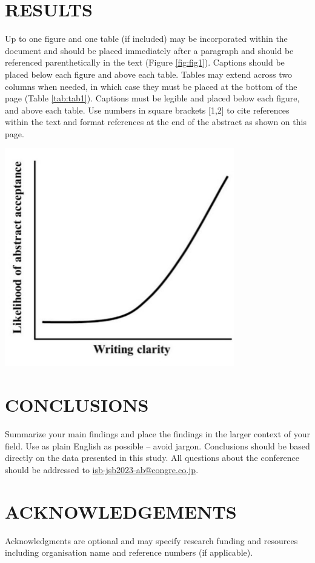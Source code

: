 \documentclass[11pt]{article}
\newenvironment{Figure}
  {\par\medskip\noindent\minipage{\linewidth}}
  {\endminipage\par\medskip}
\begin{document}
\begin{multicols}{2}
\section{RESULTS}
Up to one figure and one table (if included) may be incorporated within the document and should be placed immediately after a paragraph and should be referenced parenthetically in the text (Figure \ref{fig:fig1}). Captions should be placed below each figure and above each table. Tables may extend across two columns when needed, in which case they must be placed at the bottom of the page (Table \ref{tab:tab1}). Captions must be legible and placed below each figure, and above each table. Use numbers in square brackets [1,2] to cite references within the text and format references at the end of the abstract as shown on this page.
\begin{Figure}
    \centering
    \includegraphics[width=0.75\textwidth]{figures/figure.jpg}
    \label{fig:fig1}
\end{Figure}

\section{CONCLUSIONS}
Summarize your main findings and place the findings in the larger context of your field. Use as plain English as possible – avoid jargon. Conclusions should be based directly on the data presented in this study. All questions about the conference should be addressed to \href{mailto:isb-jsb2023-ab@congre.co.jp}{isb-jsb2023-ab@congre.co.jp}.

\section{ACKNOWLEDGEMENTS}
Acknowledgments are optional and may specify research funding and resources including organisation name and reference numbers (if applicable).

\end{multicols}
\end{document}
